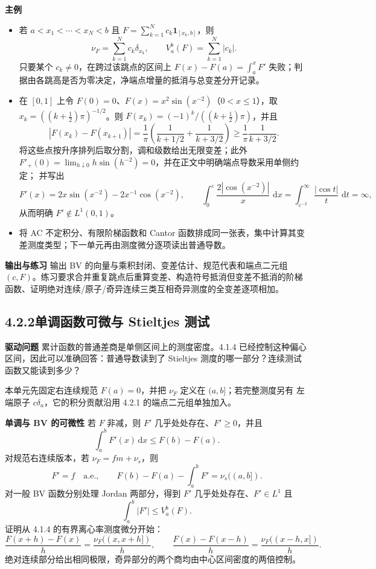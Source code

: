 \documentclass[11pt,a4paper]{ctexart}
\newcommand{\eps}{\varepsilon}
\newcommand{\dd}{\,\mathrm d}
\newcommand{\planitem}[1]{\par\smallskip\noindent\textcolor{deepblue}{\textbf{#1}}\quad}
\newcommand{\unithead}[2]{\subsection{#1\quad #2}}
\begin{document}
\planitem{主例}
\begin{itemize}
\item 若 $a<x_1<\cdots<x_N<b$ 且
$F=\sum_{k=1}^Nc_k\mathbf1_{[x_k,b]}$，则
\[
\nu_F=\sum_{k=1}^Nc_k\delta_{x_k},
\qquad V_a^b(F)=\sum_{k=1}^N|c_k|.
\]
只要某个 $c_k\ne0$，在跨过该跳点的区间上
$F(x)-F(a)=\int_a^xF'$ 失败；判据由各跳高是否为零决定，净端点增量的抵消与总变差分开记录。
\item 在 $[0,1]$ 上令 $F(0)=0$、$F(x)=x^2\sin(x^{-2})$（$0<x\le1$），取
$x_k=((k+\tfrac12)\pi)^{-1/2}$。则
$F(x_k)=(-1)^k/((k+\tfrac12)\pi)$，并且
\[
 |F(x_k)-F(x_{k+1})|
 =\frac1\pi\left(\frac1{k+1/2}+\frac1{k+3/2}\right)
 \ge\frac1\pi\frac1{k+3/2}.
\]
将这些点按升序排列后取分割，调和级数给出无限变差；此外
\(F'_+(0)=\lim_{h\downarrow0}h\sin(h^{-2})=0\)，并在正文中明确端点导数采用单侧约定；
并写出
\[
F'(x)=2x\sin(x^{-2})-2x^{-1}\cos(x^{-2}),\qquad
\int_0^\eps\frac{2|\cos(x^{-2})|}{x}\,\dd x
=\int_{\eps^{-2}}^\infty\frac{|\cos t|}{t}\,\dd t=\infty,
\]
从而明确 $F'\notin L^1(0,1)$。
\item 将 AC 不定积分、有限阶梯函数和 Cantor 函数排成同一张表，集中计算其变差测度类型；下一单元再由测度微分逐项读出普通导数。
\end{itemize}

\planitem{输出与练习}
输出 BV 的向量与乘积封闭、变差估计、规范代表和端点二元组 $(c,F)$。练习要求合并重复跳点后重算变差、构造符号抵消但变差不抵消的阶梯函数、证明绝对连续/原子/奇异连续三类互相奇异测度的全变差逐项相加。

\unithead{4.2.2}{单调函数可微与 Stieltjes 测试}

\planitem{驱动问题}
累计函数的普通差商是单侧区间上的测度密度。4.1.4 已经控制这种偏心区间，因此可以准确回答：普通导数读到了 Stieltjes 测度的哪一部分？连续测试函数又能读到多少？

本单元先固定右连续规范 $F(a)=0$，并把 $\nu_F$ 定义在 $(a,b]$；若完整测度另有
左端原子 $c\delta_a$，它的积分贡献沿用 4.2.1 的端点二元组单独加入。

\planitem{单调与 BV 的可微性}
若 $F$ 非减，则 $F'$ 几乎处处存在、$F'\ge0$，并且
\[
\int_a^bF'(x)\dd x\le F(b)-F(a).
\]
对规范右连续版本，若 $\nu_F=fm+\nu_s$，则
\[
F'=f\quad\text{a.e.},
\qquad
F(b)-F(a)-\int_a^bF'=\nu_s((a,b]).
\]
对一般 BV 函数分别处理 Jordan 两部分，得到 $F'$ 几乎处处存在、$F'\in L^1$ 且
\[
\int_a^b|F'|\le V_a^b(F).
\]
证明从 4.1.4 的有界离心率测度微分开始：
\[
\frac{F(x+h)-F(x)}h=\frac{\nu_F((x,x+h])}{h},
\qquad
\frac{F(x)-F(x-h)}h=\frac{\nu_F((x-h,x])}{h}.
\]
绝对连续部分给出相同极限，奇异部分的两个商均由中心区间密度的两倍控制。
\end{document}
